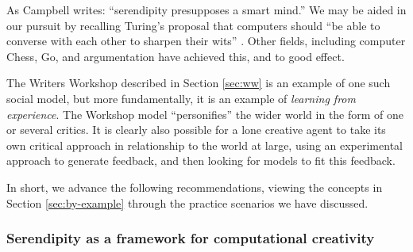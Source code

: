 As Campbell \citeyear{campbell} writes: ``serendipity
presupposes a smart mind.''  We may be aided in our pursuit by
recalling Turing's proposal that computers should ``be able to
converse with each other to sharpen their wits''
\cite{turing-intelligent}.  Other fields, including computer Chess,
Go, and argumentation have achieved this, and to good effect.

The Writers Workshop described in Section \ref{sec:ww} is an example
of one such social model, but more fundamentally, it is an example of
\emph{learning from experience}.  The Workshop model ``personifies''
the wider world in the form of one or several critics.  It is clearly
also possible for a lone creative agent to take its own critical
approach in relationship to the world at large, using an experimental
approach to generate feedback, and then looking for models to fit this
feedback.


In short, we advance the following recommendations, viewing the
concepts in Section \ref{sec:by-example} through the practice
scenarios we have discussed.

\subsubsection*{Serendipity as a framework for computational creativity}


